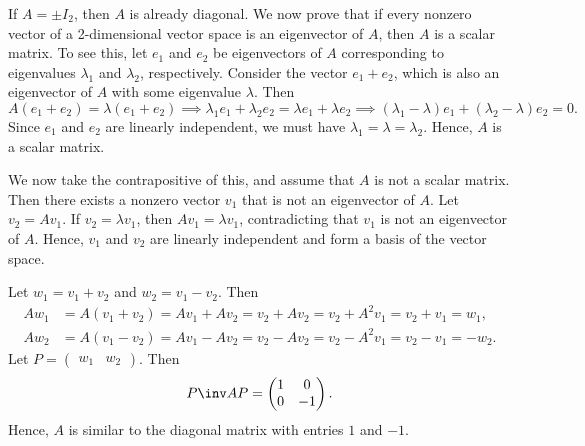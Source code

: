 \begin{sol}
    If $A = \pm I_2$, then $A$ is already diagonal.
	We now prove that if every nonzero vector of a 2-dimensional vector space is an eigenvector of $A$, then $A$ is a scalar matrix.
	To see this, let $e_1$ and $e_2$ be eigenvectors of $A$ corresponding to eigenvalues $\lambda_1$ and $\lambda_2$, respectively.
	Consider the vector $e_1 + e_2$, which is also an eigenvector of $A$ with some eigenvalue $\lambda$.
	Then
    \[
        A(e_1 + e_2) = \lambda (e_1 + e_2) \implies \lambda_1 e_1 + \lambda_2 e_2 = \lambda e_1 + \lambda e_2 \implies (\lambda_1 - \lambda) e_1 + (\lambda_2 - \lambda) e_2 = 0.
    \]
    Since $e_1$ and $e_2$ are linearly independent, we must have $\lambda_1 = \lambda = \lambda_2$.
	Hence, $A$ is a scalar matrix.

    We now take the contrapositive of this, and assume that $A$ is not a scalar matrix.
	Then there exists a nonzero vector $v_1$ that is not an eigenvector of $A$.
	Let $v_2 = Av_1$.
	If $v_2 = \lambda v_1$, then $Av_1 = \lambda v_1$, contradicting that $v_1$ is not an eigenvector of $A$.
	Hence, $v_1$ and $v_2$ are linearly independent and form a basis of the vector space.

    Let $w_1 = v_1 + v_2$ and $w_2 = v_1 - v_2$.
	Then
    \begin{align*}
        Aw_1 & = A(v_1 + v_2) = Av_1 + Av_2 = v_2 + A v_2 = v_2 + A^2 v_1 = v_2 + v_1 = w_1, \\
        Aw_2 & = A(v_1 - v_2) = Av_1 - Av_2 = v_2 - A v_2 = v_2 - A^2 v_1 = v_2 - v_1 = -w_2.
    \end{align*}
    Let $P = \begin{pmatrix} w_1 & w_2 \end{pmatrix}$.
	Then
    \[
    	P\inv AP = 
        \begin{pmatrix}
            1 & 0 \\
            0 & -1
        \end{pmatrix}.
	\]
    Hence, $A$ is similar to the diagonal matrix with entries $1$ and $-1$. 


\end{sol}
